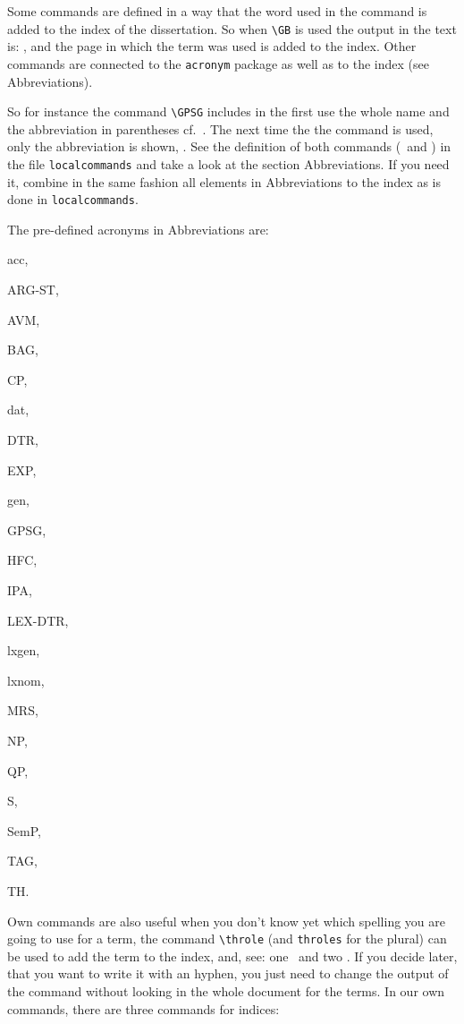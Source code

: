 Some commands are defined in a way that the word used in the command is added to the index of the dissertation. So \fe when \verb|\GB| is used the output in the text is: \GB , and the page in which the term was used is added to the index.  Other commands are connected to the \texttt{acronym} package as well as to the index (see Abbreviations). 


So for instance the command \verb|\GPSG| includes in the first use the whole name and the abbreviation in parentheses cf.\ \GPSG . The next time the the command is used, only the abbreviation is shown, \fe \GPSG . See the definition of both commands (\GB\ and \GPSG ) in the file \texttt{localcommands} and take a look at the section Abbreviations. If you need it, combine in the same fashion all elements in Abbreviations to the index as is done in \texttt{localcommands}.


The pre-defined acronyms in Abbreviations are: 
\begin{multicols}{2}

\begin{itemize*}
\item \ac{acc}, 
\item \ac{ARG-ST}, 
\item \ac{AVM},  
\item \ac{BAG}, 
\item \ac{CP}, 
\item \ac{dat}, 
\item \ac{DTR}, 
\item \ac{EXP}, 
\item \ac{gen}, 
\item \ac{GPSG}, 
\item \ac{HFC}, 
\item \ac{IPA}, 
\item \ac{LEX-DTR}, 
\item \ac{lxgen},  
\item \ac{lxnom}, 
\item \ac{MRS}, 
\item \ac{NP}, 
\item \ac{QP}, 
\item \ac{S}, 
\item \ac{SemP}, 
\item \ac{TAG}, 
\item \ac{TH}. 
\end{itemize*}

\end{multicols}

Own commands are also useful when you don't know yet which spelling you are going to use for a term, \fe the command \verb|\throle| (and \verb|throles| for the plural) can be used to add the term to the index, and, see: one \throle\ and two \throles . If you decide later, that you want to write it with an hyphen, you just need to change the output of the command without looking in the whole document for the terms. In our own commands, there are three commands for indices:

